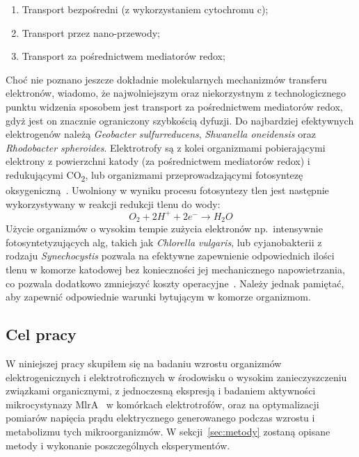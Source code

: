 \begin{enumerate}
    \item Transport bezpośredni (z wykorzystaniem cytochromu c);
    \item Transport przez nano-przewody;
    \item Transport za pośrednictwem mediatorów redox;
\end{enumerate}

Choć nie poznano jeszcze dokładnie molekularnych mechanizmów
transferu elektronów, wiadomo, że najwolniejszym oraz
niekorzystnym z technologicznego punktu widzenia sposobem jest
transport za pośrednictwem mediatorów redox, gdyż jest on znacznie
ograniczony szybkością dyfuzji.
Do najbardziej efektywnych elektrogenów należą
\textit{Geobacter sulfurreducens}, \textit{Shwanella oneidensis}
oraz \textit{Rhodobacter spheroides}.
Elektrotrofy są z kolei organizmami pobierającymi elektrony
z powierzchni katody (za pośrednictwem mediatorów redox)
i redukującymi CO\textsubscript{2}, lub organizmami przeprowadzającymi fotosyntezę
oksygeniczną~\cite{Santoro2017, Reddy2019}.
Uwolniony w wyniku procesu fotosyntezy tlen jest następnie
wykorzystywany w reakcji redukcji tlenu do wody:
\begin{equation}
    \label{eq:2}
    O_2 + 2H^+ + 2e^- \rightarrow H_2 O
\end{equation}
Użycie organizmów o wysokim tempie zużycia elektronów np.\ intensywnie
fotosyntetyzujących alg, takich jak \textit{Chlorella vulgaris},
lub cyjanobakterii z rodzaju \textit{Synechocystis} pozwala na efektywne
zapewnienie odpowiednich ilości tlenu w komorze katodowej bez
konieczności jej mechanicznego napowietrzania, co pozwala dodatkowo
zmniejszyć koszty operacyjne~\cite{Reddy2019}.
Należy jednak pamiętać, aby zapewnić odpowiednie warunki
bytującym w komorze organizmom.

\subsection{Cel pracy}\label{subsec:badania}

W niniejszej pracy skupiłem się na badaniu wzrostu organizmów
elektrogenicznych i elektrotroficznych
w środowisku o wysokim zanieczyszczeniu związkami
organicznymi, z jednoczesną ekspresją i badaniem aktywności mikrocystynazy
MlrA~\cite{Dexter2018, Dexter2021} w komórkach elektrotrofów,
oraz na optymalizacji pomiarów napięcia prądu elektrycznego generowanego
podczas wzrostu i metabolizmu tych mikroorganizmów.
W sekcji~\ref{sec:metody} zostaną opisane metody i wykonanie
poszczególnych eksperymentów.